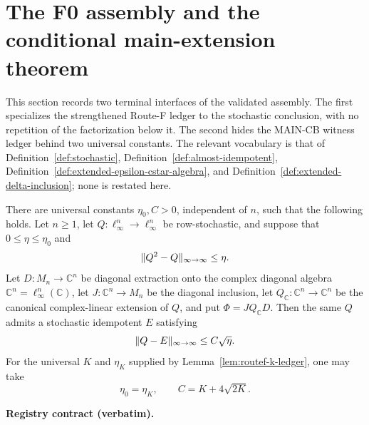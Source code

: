 \section{The F0 assembly and the conditional main-extension theorem}\label{sec:routef-f0-assembly}

This section records two terminal interfaces of the validated assembly.  The first
specializes the strengthened Route-F ledger to the stochastic conclusion, with no
repetition of the factorization below it.  The second hides the MAIN-CB witness ledger
behind two universal constants.  The relevant vocabulary is that of
Definition~\ref{def:stochastic}, Definition~\ref{def:almost-idempotent},
Definition~\ref{def:extended-epsilon-cstar-algebra}, and
Definition~\ref{def:extended-delta-inclusion}; none is restated here.

\begin{lemma}\label{lem:routef-f0-assembly}
There are universal constants $\eta_{0},C>0$, independent of $n$, such that the
following holds.  Let $n\ge1$, let
$Q:\ell_{\infty}^{n}\to\ell_{\infty}^{n}$ be row-stochastic, and suppose that
$0\le\eta\le\eta_{0}$ and
\[
  \lVert Q^{2}-Q\rVert_{\infty\to\infty}\le\eta .
\]
Let $D:M_{n}\to\mathbb C^{n}$ be diagonal extraction onto the complex diagonal
algebra $\mathbb C^{n}=\ell_{\infty}^{n}(\mathbb C)$, let
$J:\mathbb C^{n}\to M_{n}$ be the diagonal inclusion, let
$Q_{\mathbb C}:\mathbb C^{n}\to\mathbb C^{n}$ be the canonical complex-linear
extension of $Q$, and put $\Phi=JQ_{\mathbb C}D$.  Then the same $Q$ admits a
stochastic idempotent $E$ satisfying
\[
  \lVert Q-E\rVert_{\infty\to\infty}\le C\sqrt\eta .
\]
For the universal $K$ and $\eta_{K}$ supplied by
Lemma~\ref{lem:routef-k-ledger}, one may take
\[
  \eta_{0}=\eta_{K},
  \qquad
  C=K+4\sqrt{2K}.
\]
\end{lemma}

\noindent\textbf{Registry contract (verbatim).}

